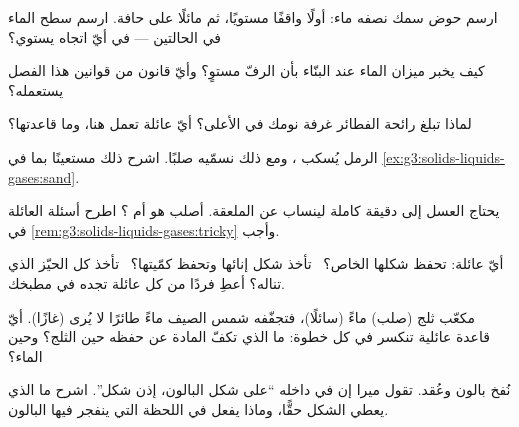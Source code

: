 \begin{exercise}[$\star$]\label{exo:g3:solids-liquids-gases:4}
ارسم حوض سمك نصفه ماء: أولًا واقفًا مستويًا، ثم مائلًا على
حافة. ارسم سطح الماء في الحالتين --- في أيّ اتجاه يستوي؟
\end{exercise}

\begin{exercise}[$\star$]\label{exo:g3:solids-liquids-gases:5}
كيف يخبر ميزان الماء عند البنّاء بأن الرفّ مستوٍ؟ وأيّ قانون من
قوانين هذا الفصل يستعمله؟
\end{exercise}

\begin{exercise}[$\star$]\label{exo:g3:solids-liquids-gases:6}
لماذا تبلغ رائحة الفطائر غرفة نومك في الأعلى؟ أيّ عائلة تعمل
هنا، وما قاعدتها؟
\end{exercise}

\begin{exercise}[$\star$]\label{exo:g3:solids-liquids-gases:7}
الرمل يُسكب ، ومع ذلك نسمّيه صلبًا. اشرح ذلك مستعينًا
بما في \cref{ex:g3:solids-liquids-gases:sand}.
\end{exercise}

\begin{exercise}[$\star$]\label{exo:g3:solids-liquids-gases:8}
يحتاج العسل إلى دقيقة كاملة لينساب عن الملعقة. أصلب هو أم ؟
اطرح أسئلة العائلة في
\cref{rem:g3:solids-liquids-gases:tricky} وأجب.
\end{exercise}

\begin{exercise}[$\star$]\label{exo:g3:solids-liquids-gases:9}
أيّ عائلة: تحفظ شكلها الخاص؟ \ تأخذ شكل إنائها وتحفظ كمّيتها؟
\ تأخذ كل الحيّز الذي تناله؟ أعطِ فردًا من كل عائلة تجده في
مطبخك.
\end{exercise}

\begin{exercise}[$\star\star$]\label{exo:g3:solids-liquids-gases:10}
مكعّب ثلج (صلب)  ماءً (سائلًا)، فتجفّفه شمس الصيف ماءً
طائرًا لا يُرى (غازًا). أيّ قاعدة عائلية تنكسر في كل خطوة: ما
الذي تكفّ المادة عن حفظه حين  الثلج؟ وحين  الماء؟
\end{exercise}

\begin{exercise}[$\star\star$]\label{exo:g3:solids-liquids-gases:11}
نُفخ بالون وعُقد. تقول ميرا إن  في داخله ``على شكل
البالون، إذن  شكل''. اشرح ما الذي يعطي الشكل حقًّا، وماذا
يفعل  في اللحظة التي ينفجر فيها البالون.
\end{exercise}
